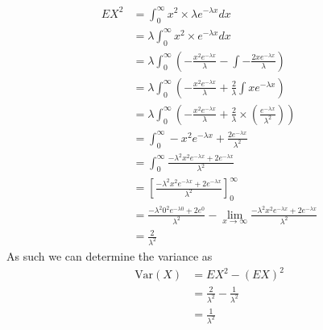 \begin{align*}
    EX^{2}&=\int_{0}^{\infty}x^{2}\times \lambda e^{-\lambda x}dx \\
       &=\lambda\int_{0}^{\infty}x^{2}\times e^{-\lambda x}dx \\
       &=\lambda\int_{0}^{\infty}\left(-\frac{x^{2}e^{-\lambda x}}{\lambda}-\int-\frac{2xe^{-\lambda x}}{\lambda}\right) \\
       &=\lambda\int_{0}^{\infty}\left(-\frac{x^{2}e^{-\lambda x}}{\lambda}+\frac{2}{\lambda}\int xe^{-\lambda x}\right) \\
       &=\lambda\int_{0}^{\infty}\left(-\frac{x^{2}e^{-\lambda x}}{\lambda}+\frac{2}{\lambda}\times\left(\frac{e^{-\lambda x}}{\lambda^{2}}\right)\right) \\
       &=\int_{0}^{\infty}-x^{2}e^{-\lambda x}+\frac{2e^{-\lambda x}}{\lambda^{2}} \\
       &=\int_{0}^{\infty}\frac{-\lambda^{2}x^{2}e^{-\lambda x}+2e^{-\lambda x}}{\lambda^{2}} \\
       &=\left[\frac{-\lambda^{2}x^{2}e^{-\lambda x}+2e^{-\lambda x}}{\lambda^{2}}\right]_{0}^{\infty} \\
       &=\frac{-\lambda^{2}0^{2}e^{-\lambda 0}+2e^{0}}{\lambda^{2}}-\lim_{x\rightarrow \infty}\frac{-\lambda^{2}x^{2}e^{-\lambda x}+2e^{-\lambda x}}{\lambda^{2}} \\
       &=\frac{2}{\lambda^{2}}
\end{align*}
As such we can determine the variance as
\begin{align*}
    \text{Var}(X)&=EX^{2}-(EX)^{2} \\
             &=\frac{2}{\lambda^{2}}-\frac{1}{\lambda^{2}} \\
             &=\frac{1}{\lambda^{2}}
\end{align*}
